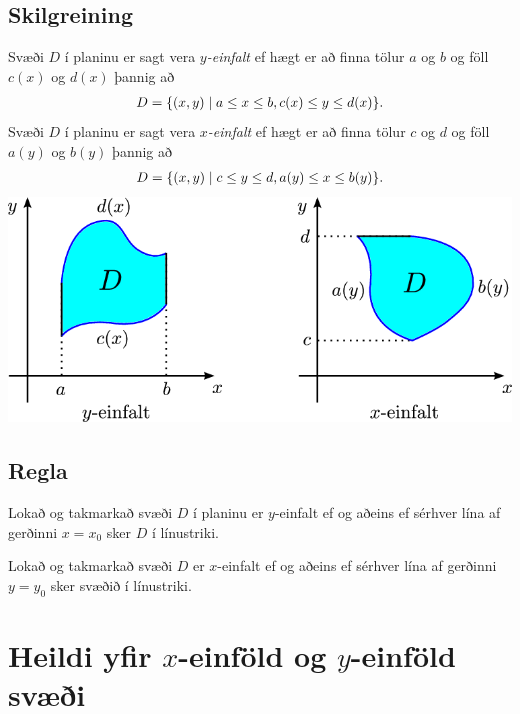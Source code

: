 \documentclass[a4paper,10pt,icelandic]{sphinxmanual}
\begin{document}
\subsection{Skilgreining}
\label{Kafli4:index-4}\label{Kafli4:id6}
Svæði \(D\) í planinu er sagt vera \(y\)\emph{-einfalt} ef hægt er
að finna tölur \(a\) og \(b\) og föll \(c(x)\) og
\(d(x)\) þannig að
\begin{gather}
\begin{split}\displaystyle D=\{(x,y)\mid a\leq x\leq b, c(x)\leq y\leq d(x)\}.\end{split}\notag
\end{gather}
Svæði \(D\) í planinu er sagt vera \(x\)\emph{-einfalt} ef hægt er
að finna tölur \(c\) og \(d\) og föll \(a(y)\) og
\(b(y)\) þannig að
\begin{gather}
\begin{split}\displaystyle D=\{(x,y)\mid c\leq y\leq d, a(y)\leq x\leq b(y)\}.\end{split}\notag
\end{gather}
{\hfill\includegraphics[width=0.650\linewidth]{einfalt.png}\hfill}


\subsection{Regla}
\label{Kafli4:regla}
Lokað og takmarkað svæði \(D\) í planinu er \(y\)-einfalt ef og
aðeins ef sérhver lína af gerðinni \(x=x_0\) sker \(D\) í
línustriki.

Lokað og takmarkað svæði \(D\) er \(x\)-einfalt ef og aðeins ef
sérhver lína af gerðinni \(y=y_0\) sker svæðið í línustriki.


\section{Heildi yfir \(x\)-einföld og \(y\)-einföld svæði}
\label{Kafli4:heildi-yfir-einfold-og-einfold-svaei}
\end{document}
